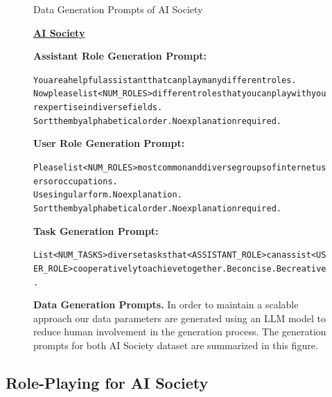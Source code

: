 \begin{figure}[h]
\begin{AIBox}{Data Generation Prompts of AI Society}
{
\parbox[h]{0.5\textwidth}{{\bf \underline{AI Society}}\\

\parbox[h]{0.5\textwidth}{{\small \bf Assistant Role Generation Prompt:} \scriptsize\begin{alltt}
You are a helpful assistant that can play many different roles.
Now please list <NUM\_ROLES> different roles that you can play with your expertise in diverse fields.
Sort them by alphabetical order. No explanation required.
\end{alltt}}%
\parbox[h]{0.5\textwidth}{{\small \bf User Role Generation Prompt:} \scriptsize\begin{alltt}
Please list <NUM\_ROLES> most common and diverse groups of internet users or occupations.\\
Use singular form. No explanation.\\
Sort them by alphabetical order. No explanation required.
\end{alltt}}

\parbox[h]{\textwidth}{{\small \bf Task Generation Prompt:} \scriptsize\begin{alltt}
List <NUM\_TASKS> diverse tasks that <ASSISTANT\_ROLE> can assist <USER\_ROLE> cooperatively to achieve together. Be concise. Be creative.
\end{alltt}}%

}}

\end{AIBox}
	\caption{\textbf{Data Generation Prompts.} In order to maintain a scalable approach our data parameters are generated using an LLM model to reduce human involvement in the generation process. The generation prompts for both AI Society dataset are summarized in this figure.}\label{fig:generation_prompts}
\end{figure}


\subsection{Role-Playing for AI Society}\label{sec:roleplaying}

